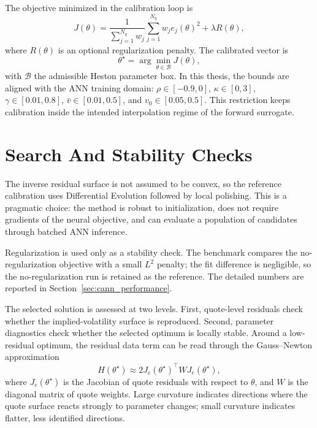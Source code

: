 The objective minimized in the calibration loop is
\begin{equation}
\label{eq:cann_objective}
J(\theta)
=
\frac{1}{\sum_{j=1}^{N_q} w_j}
\sum_{j=1}^{N_q} w_j e_j(\theta)^2
+\lambda R(\theta),
\end{equation}
where \(R(\theta)\) is an optional regularization penalty. The calibrated vector is
\begin{equation}
\label{eq:cann_argmin}
\theta^\star
=
\arg\min_{\theta\in\mathcal{B}}J(\theta),
\end{equation}
with \(\mathcal{B}\) the admissible Heston parameter box. In this thesis, the bounds are aligned with the ANN training domain: \(\rho\in[-0.9,0]\), \(\kappa\in[0,3]\), \(\gamma\in[0.01,0.8]\), \(\bar v\in[0.01,0.5]\), and \(v_0\in[0.05,0.5]\). This restriction keeps calibration inside the intended interpolation regime of the forward surrogate.

\section{Search And Stability Checks}

The inverse residual surface is not assumed to be convex, so the reference calibration uses Differential Evolution followed by local polishing. This is a pragmatic choice: the method is robust to initialization, does not require gradients of the neural objective, and can evaluate a population of candidates through batched ANN inference.

Regularization is used only as a stability check. The benchmark compares the no-regularization objective with a small \(L^2\) penalty; the fit difference is negligible, so the no-regularization run is retained as the reference. The detailed numbers are reported in Section~\ref{sec:cann_performance}.

The selected solution is assessed at two levels. First, quote-level residuals check whether the implied-volatility surface is reproduced. Second, parameter diagnostics check whether the selected optimum is locally stable. Around a low-residual optimum, the residual data term can be read through the Gauss--Newton approximation
\[
H(\theta^\star)\approx 2J_e(\theta^\star)^\top WJ_e(\theta^\star),
\]
where \(J_e(\theta^\star)\) is the Jacobian of quote residuals with respect to \(\theta\), and \(W\) is the diagonal matrix of quote weights. Large curvature indicates directions where the quote surface reacts strongly to parameter changes; small curvature indicates flatter, less identified directions.

